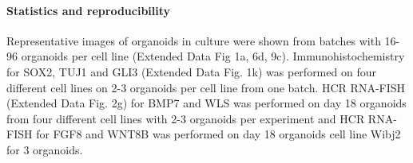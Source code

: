 \paragraph{Statistics and reproducibility}
Representative images of organoids in culture were shown from batches with 16-96 organoids per cell line (Extended Data Fig 1a, 6d, 9c). Immunohistochemistry for SOX2, TUJ1 and GLI3 (Extended Data Fig. 1k) was performed on four different cell lines on 2-3 organoids per cell line from one batch. HCR RNA-FISH (Extended Data Fig. 2g) for BMP7 and WLS was performed on day 18 organoids from four different cell lines with 2-3 organoids per experiment and HCR RNA-FISH for FGF8 and WNT8B was performed on day 18 organoids cell line Wibj2 for 3 organoids.

